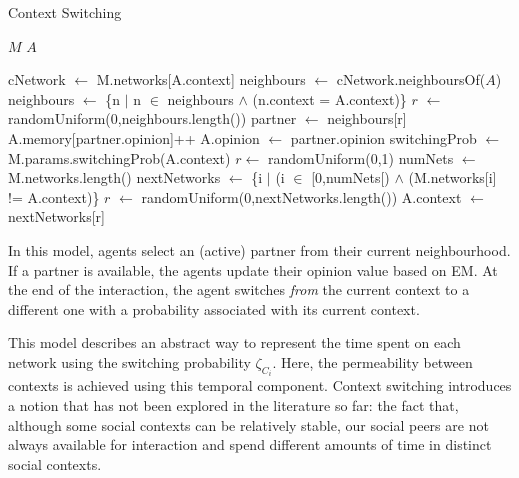 \documentclass[preprint,number]{elsarticle}
\begin{document}
	\begin{algorithm}[H]
		\caption{Context Switching}
		\label{model:context_switching}
		\begin{algorithmic}
			\vspace{0.5em}
			\STATE $M$ 
			\STATE $A$ 
			\\ \hrulefill 
			
			\STATE{}
			\STATE cNetwork $\leftarrow$ M.networks[A.context]
			\STATE 
			\STATE {}
			\STATE neighbours $\leftarrow$ cNetwork.neighboursOf($A$) 
			\STATE {}
			\STATE neighbours $\leftarrow$ \{n $|$ n $\in$ neighbours $\wedge$ (n.context = A.context)\}
			\STATE
			\STATE{} 
			\STATE $r$ $\leftarrow$ randomUniform(0,neighbours.length())
			\STATE partner $\leftarrow$ neighbours[r]
			\STATE
			\STATE {}
			\STATE {}
			\STATE A.memory[partner.opinion]++
			\STATE A.opinion $\leftarrow$ partner.opinion
			\ENDIF
			\STATE
			\STATE {}
			\STATE switchingProb $\leftarrow$ M.params.switchingProb(A.context)
			\STATE $r \leftarrow $ randomUniform(0,1)
			\STATE numNets $\leftarrow$ M.networks.length()
			\STATE nextNetworks $\leftarrow$ \{i $|$ (i $\in$ [0,numNets[) $\wedge$ (M.networks[i] != A.context)\}
			\STATE $r$ $\leftarrow$ randomUniform(0,nextNetworks.length())
			\STATE A.context $\leftarrow$ nextNetworks[r]
			\ENDIF
		\end{algorithmic}
	\end{algorithm}
	\noindent In this model, agents select an (active) partner from their current
        neighbourhood. If a partner is available, the agents update their opinion value based on
        EM. At the end of the interaction, the agent switches \textit{from} the current context to a
        different one with a probability associated with its current context.
	
	This model describes an abstract way to represent the time spent on each network using the
        switching probability $\zeta_{C_i}$. Here, the permeability between contexts is achieved
        using this temporal component. Context switching introduces a notion that has not been
        explored in the literature so far: the fact that, although some social contexts can be
        relatively stable, our social peers are not always available for interaction and spend
        different amounts of time in distinct social contexts.
	
\end{document}

